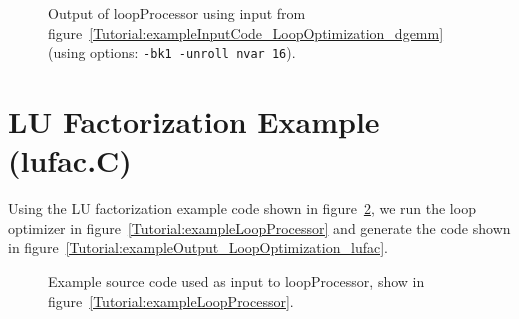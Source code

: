 \begin{figure}[!h]
{\indent
{\mySmallFontSize


\begin{latexonly}
   
\end{latexonly}

\begin{htmlonly}
   
\end{htmlonly}

}
}
\caption{Output of loopProcessor using input from figure~\ref{Tutorial:exampleInputCode_LoopOptimization_dgemm}
    (using options: {\tt -bk1 -unroll nvar 16}).}
\label{Tutorial:exampleOutput_LoopOptimization_dgemm}
\end{figure}



\section{LU Factorization Example (lufac.C)}

   Using the LU factorization example code shown in 
figure~\ref{Tutorial:exampleInputCode_LoopOptimization_lufac}, we run the loop optimizer in
figure~\ref{Tutorial:exampleLoopProcessor} and generate the code shown in 
figure~\ref{Tutorial:exampleOutput_LoopOptimization_lufac}.

\begin{figure}[!h]
{\indent
{\mySmallFontSize


\begin{latexonly}
   
\end{latexonly}

\begin{htmlonly}
   
\end{htmlonly}

}
}
\caption{Example source code used as input to loopProcessor, show in figure~\ref{Tutorial:exampleLoopProcessor}.}
\label{Tutorial:exampleInputCode_LoopOptimization_lufac}
\end{figure}

